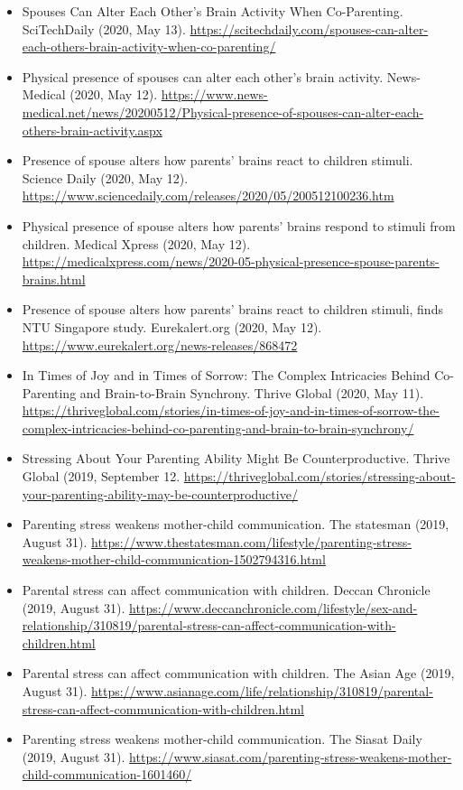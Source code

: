 \documentclass[10pt,a4paper]{altacv}
\begin{document}
\begin{fullwidth}
\begin{itemize}
			\item Spouses Can Alter Each Other’s Brain Activity When Co-Parenting. SciTechDaily (2020, May 13). \url{https://scitechdaily.com/spouses-can-alter-each-others-brain-activity-when-co-parenting/}
			\item Physical presence of spouses can alter each other's brain activity. News-Medical (2020, May 12). \url{https://www.news-medical.net/news/20200512/Physical-presence-of-spouses-can-alter-each-others-brain-activity.aspx}
			\item Presence of spouse alters how parents' brains react to children stimuli. Science Daily (2020, May 12). \url{https://www.sciencedaily.com/releases/2020/05/200512100236.htm}
			\item Physical presence of spouse alters how parents' brains respond to stimuli from children. Medical Xpress (2020, May 12). \url{https://medicalxpress.com/news/2020-05-physical-presence-spouse-parents-brains.html}
			\item Presence of spouse alters how parents' brains react to children stimuli, finds NTU Singapore study. Eurekalert.org (2020, May 12). \url{https://www.eurekalert.org/news-releases/868472}
			\item In Times of Joy and in Times of Sorrow: The Complex Intricacies Behind Co-Parenting and Brain-to-Brain Synchrony. Thrive Global (2020, May 11). \url{https://thriveglobal.com/stories/in-times-of-joy-and-in-times-of-sorrow-the-complex-intricacies-behind-co-parenting-and-brain-to-brain-synchrony/}
			\item Stressing About Your Parenting Ability Might Be Counterproductive. Thrive Global (2019, September 12. \url{https://thriveglobal.com/stories/stressing-about-your-parenting-ability-may-be-counterproductive/}
			\item Parenting stress weakens mother-child communication. The statesman (2019, August 31). \url{https://www.thestatesman.com/lifestyle/parenting-stress-weakens-mother-child-communication-1502794316.html}
			\item Parental stress can affect communication with children. Deccan Chronicle (2019, August 31). \url{https://www.deccanchronicle.com/lifestyle/sex-and-relationship/310819/parental-stress-can-affect-communication-with-children.html}
			\item Parental stress can affect communication with children. The Asian Age (2019, August 31). \url{https://www.asianage.com/life/relationship/310819/parental-stress-can-affect-communication-with-children.html}
			\item Parenting stress weakens mother-child communication. The Siasat Daily (2019, August 31). \url{https://www.siasat.com/parenting-stress-weakens-mother-child-communication-1601460/}

\end{itemize}
\end{fullwidth}
\end{document}
